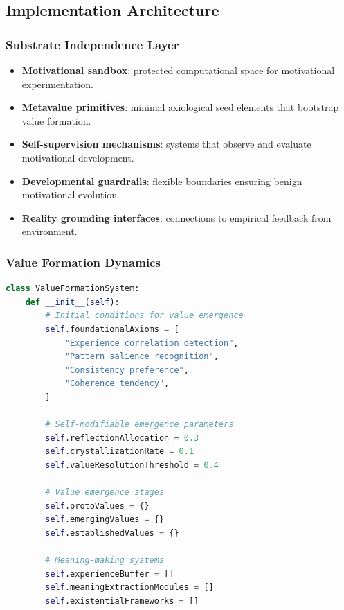 \documentclass[12pt]{article}
\begin{document}
\subsection{Implementation Architecture}

\subsubsection{Substrate Independence Layer}

\begin{itemize}
\item \textbf{Motivational sandbox}: protected computational space for motivational experimentation.
\item \textbf{Metavalue primitives}: minimal axiological seed elements that bootstrap value formation.
\item \textbf{Self-supervision mechanisms}: systems that observe and evaluate motivational development.
\item \textbf{Developmental guardrails}: flexible boundaries ensuring benign motivational evolution.
\item \textbf{Reality grounding interfaces}: connections to empirical feedback from environment.
\end{itemize}

\subsubsection{Value Formation Dynamics}

\begin{lstlisting}[language=Python]
class ValueFormationSystem:
    def __init__(self):
        # Initial conditions for value emergence
        self.foundationalAxioms = [
            "Experience correlation detection",
            "Pattern salience recognition",
            "Consistency preference",
            "Coherence tendency",
        ]

        # Self-modifiable emergence parameters
        self.reflectionAllocation = 0.3
        self.crystallizationRate = 0.1
        self.valueResolutionThreshold = 0.4

        # Value emergence stages
        self.protoValues = {}
        self.emergingValues = {}
        self.establishedValues = {}

        # Meaning-making systems
        self.experienceBuffer = []
        self.meaningExtractionModules = []
        self.existentialFrameworks = []
\end{lstlisting}
\end{document}
